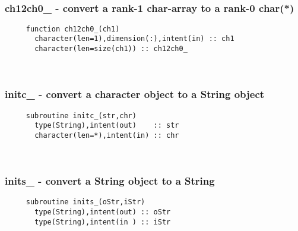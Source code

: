 \mbox{}\hrulefill\ 
 
  \subsubsection{ch12ch0\_ - convert a rank-1 char-array to a rank-0 char(*)}

\begin{verbatim} 
     function ch12ch0_(ch1)
       character(len=1),dimension(:),intent(in) :: ch1
       character(len=size(ch1)) :: ch12ch0_
 \end{verbatim}%
 
 
\mbox{}\hrulefill\ 

  \subsubsection{initc\_ - convert a character object to a String object}

\begin{verbatim} 
     subroutine initc_(str,chr)
       type(String),intent(out)    :: str
       character(len=*),intent(in) :: chr
 \end{verbatim}%
 
 
\mbox{}\hrulefill\ 
 

  \subsubsection{inits\_ - convert a String object to a String}

\begin{verbatim} 
     subroutine inits_(oStr,iStr)
       type(String),intent(out) :: oStr
       type(String),intent(in ) :: iStr
 \end{verbatim}%
 
